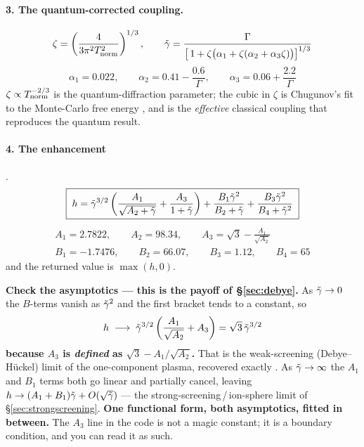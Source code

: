 \paragraph{3. The quantum-corrected coupling.}
%
\begin{equation}
\zeta = \left(\frac{4}{3\pi^2 T_{\rm norm}^2}\right)^{1/3},
\qquad
\tilde\gamma = \frac{\Gamma}
        {\bigl[\,1 + \zeta\bigl(\alpha_1 + \zeta(\alpha_2 + \alpha_3\zeta)\bigr)\bigr]^{1/3}}
\label{eq:gammatilde}
\end{equation}
%
\begin{equation*}
\alpha_1 = 0.022,\qquad
\alpha_2 = 0.41 - \frac{0.6}{\Gamma},\qquad
\alpha_3 = 0.06 + \frac{2.2}{\Gamma}
\end{equation*}
%
$\zeta \propto T_{\rm norm}^{-2/3}$ is the quantum-diffraction parameter; the
cubic in $\zeta$ is Chugunov's fit to the Monte-Carlo free energy
\citep[eqs.~3, 21]{chugunov2007}, and \gtil{} is the \emph{effective} classical
coupling that reproduces the quantum result.

\paragraph{4. The enhancement} \citep[eq.~19]{chugunov2007}.
%
\begin{equation}
\boxed{\;
h = \tilde\gamma^{3/2}\left(\frac{A_1}{\sqrt{A_2+\tilde\gamma}} + \frac{A_3}{1+\tilde\gamma}\right)
+ \frac{B_1\tilde\gamma^{2}}{B_2+\tilde\gamma}
+ \frac{B_3\tilde\gamma^{2}}{B_4+\tilde\gamma^{2}}
\;}
\label{eq:chugunov}
\end{equation}
%
\begin{gather*}
A_1 = 2.7822,\qquad A_2 = 98.34,\qquad
\boxed{A_3 = \sqrt3 - \frac{A_1}{\sqrt{A_2}}} \\[2pt]
B_1 = -1.7476,\qquad B_2 = 66.07,\qquad B_3 = 1.12,\qquad B_4 = 65
\end{gather*}
%
and the returned value is $\max(h, 0)$.

\textbf{Check the asymptotics --- this is the payoff of \S\ref{sec:debye}.} As
$\tilde\gamma \to 0$ the $B$-terms vanish as $\tilde\gamma^2$ and the first bracket tends to a
constant, so
%
\begin{equation*}
h \;\longrightarrow\; \tilde\gamma^{3/2}\left(\frac{A_1}{\sqrt{A_2}} + A_3\right)
= \sqrt3\,\tilde\gamma^{3/2}
\end{equation*}
%
\textbf{because $A_3$ is \emph{defined} as $\sqrt3 - A_1/\sqrt{A_2}$.} That is
the weak-screening (Debye--H\"uckel) limit of the one-component plasma,
recovered exactly \citep[\S IV.C]{chugunov2007}. As $\tilde\gamma \to \infty$ the $A_1$
and $B_1$ terms both go linear and partially cancel, leaving
$h \to (A_1+B_1)\tilde\gamma + O(\sqrt{\tilde\gamma})$ --- the strong-screening\,/\,ion-sphere
limit of \S\ref{sec:strongscreening}. \textbf{One functional form, both
asymptotics, fitted in between.} The $A_3$ line in the code is not a magic
constant; it is a boundary condition, and you can read it as such.

